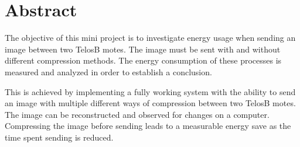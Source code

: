 \section{Abstract}
The objective of this mini project is to investigate energy usage when sending an image between two TelosB motes. 
The image must be sent with and without different compression methods. 
The energy consumption of these processes is measured and analyzed in order to establish a conclusion.

This is achieved by implementing a fully working system with the ability to send an image with multiple different ways of compression between two TelosB motes.
The image can be reconstructed and observed for changes on a computer.
Compressing the image before sending leads to a measurable energy save as the time spent sending is reduced. 
